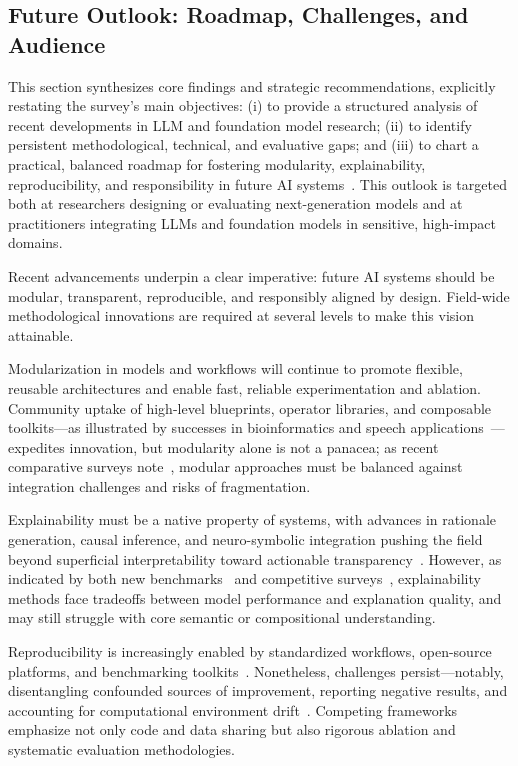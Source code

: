 \documentclass[sigconf]{acmart}
\begin{document}
\subsection{Future Outlook: Roadmap, Challenges, and Audience}

This section synthesizes core findings and strategic recommendations, explicitly restating the survey's main objectives: (i) to provide a structured analysis of recent developments in LLM and foundation model research; (ii) to identify persistent methodological, technical, and evaluative gaps; and (iii) to chart a practical, balanced roadmap for fostering modularity, explainability, reproducibility, and responsibility in future AI systems~\cite{ref91,ref92,ref93,ref94,ref95,ref96,ref97,ref98,ref99,ref100,ref101,ref102,ref103,ref104,ref105,ref106,ref107,ref108}. This outlook is targeted both at researchers designing or evaluating next-generation models and at practitioners integrating LLMs and foundation models in sensitive, high-impact domains.

Recent advancements underpin a clear imperative: future AI systems should be modular, transparent, reproducible, and responsibly aligned by design. Field-wide methodological innovations are required at several levels to make this vision attainable.

Modularization in models and workflows will continue to promote flexible, reusable architectures and enable fast, reliable experimentation and ablation. Community uptake of high-level blueprints, operator libraries, and composable toolkits---as illustrated by successes in bioinformatics and speech applications~\cite{ref78,ref86,ref87,ref98,ref100,ref101,ref102}---expedites innovation, but modularity alone is not a panacea; as recent comparative surveys note~\cite{ref55}, modular approaches must be balanced against integration challenges and risks of fragmentation.

Explainability must be a native property of systems, with advances in rationale generation, causal inference, and neuro-symbolic integration pushing the field beyond superficial interpretability toward actionable transparency~\cite{ref9,ref31,ref36,ref49,ref50,ref51,ref55,ref83,ref93}. However, as indicated by both new benchmarks~\cite{ref94,ref96,ref97} and competitive surveys~\cite{ref55}, explainability methods face tradeoffs between model performance and explanation quality, and may still struggle with core semantic or compositional understanding.

Reproducibility is increasingly enabled by standardized workflows, open-source platforms, and benchmarking toolkits~\cite{ref81,ref83,ref91,ref92,ref95,ref97,ref99,ref106,ref107,ref108}. Nonetheless, challenges persist---notably, disentangling confounded sources of improvement, reporting negative results, and accounting for computational environment drift~\cite{ref107}. Competing frameworks emphasize not only code and data sharing but also rigorous ablation and systematic evaluation methodologies.
\end{document}
